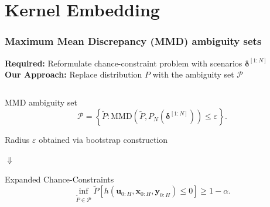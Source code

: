 \documentclass[student, noshadow, itr, english, aspectratio=169]{ITR_LSR_slides}
\begin{document}
\section{Kernel Embedding}

\begin{frame}
	\frametitle{Maximum Mean Discrepancy (MMD) ambiguity sets}
\textbf{Required:} Reformulate chance-constraint problem with scenarios $\boldsymbol{\delta}^{[1:N]}$\\
\textbf{Our Approach:} Replace distribution $P$ with the ambiguity set $\mathcal{P}$\\

\begin{columns}[onlytextwidth, T]
\begin{column}{.65\textwidth}

\begin{block}{MMD ambiguity set}
\begin{equation*}
\mathcal{P} =  \left\{ \tilde{P} : \text{MMD} (\tilde{P}, P_N(\boldsymbol{\delta}^{[1:N]})) \leq \varepsilon \right\}.
\end{equation*}
\end{block}	

Radius $\varepsilon$ obtained via bootstrap construction 

\makebox[4.2cm]{\hfill} $\boldsymbol{\Downarrow}$ 

\begin{block}{Expanded Chance-Constraints}
\begin{equation*}
\inf\limits_{\tilde{P} \in \mathcal{P}}\tilde{P} \left[ h(\boldsymbol{u}_{0:H},  \boldsymbol{x}_{0:H},  \boldsymbol{y}_{0:H}) \leq 0 \right] \geq 1 - \alpha.
\end{equation*}
\end{block}



\end{column}
\end{columns}
\end{frame}
\end{document}
